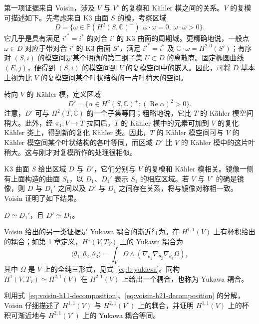 第一项证据来自 Voisin，涉及 $V$ 与 $V^\circ$ 的复模和 Kähler 模之间的关系。$V$ 的复模可描述如下。先考虑来自 K3 曲面 $S$ 的模，考察区域
\[
D=\{\omega\in\mathbb P(H^2(S,\mathbb C)^-):
\omega\cdot\omega=0,\ \omega\cdot\overline\omega>0\}.
\]
它几乎是具有满足 $i'^*=i^*$ 的对合 $i'$ 的 K3 曲面的周期域。更精确地说，一般点 $\omega\in D$ 对应于带对合 $i'$ 的 K3 曲面 $S'$，满足 $i'^*=i^*$ 及 $\mathbb C\cdot\omega=H^{2,0}(S')$；有序对 $(S,i)$ 的模空间是某个明确的第二纲子集 $U\subset D$ 的离散商。固定椭圆曲线 $(E,j)$，便得到 $(S,i)$ 的模空间到 $V$ 的复模空间中的嵌入。因此，可将 $D$ 基本上视为比 $V$ 的复模空间某个叶状结构的一片叶稍大的空间。

转向 $V$ 的 Kähler 模，定义区域
\[
D'=\{\alpha\in H^2(S,\mathbb C)^+:(\operatorname{Re}\alpha)^2>0\}.
\]
注意，$D'$ 可与 $H^2(T,\mathbb C)$ 的一个子集等同；粗略地说，它比 $T$ 的 Kähler 模空间稍大。此外，经 $\pi_1:V\to T$ 拉回后，$T$ 的 Kähler 模中的元素可加到 $V$ 的复化 Kähler 类上，得到新的复化 Kähler 类。因此，$T$ 的 Kähler 模空间可与 $V$ 的 Kähler 模空间某个叶状结构的各叶等同，而区域 $D'$ 比 $V$ 的 Kähler 模中的这片叶稍大。这与刚才对复模所作的处理很相似。

K3 曲面 $S$ 给出区域 $D$ 与 $D'$，它们分别与 $V$ 的复模和 Kähler 模相关。镜像一侧有上面构造的曲面 $S_1$，以 $D_1$、$D_1'$ 表示 $S_1$ 的相应区域。若 $V$ 与 $V^\circ$ 的确是镜像，则 $D$ 与 $D_1'$ 之间以及 $D'$ 与 $D_1$ 之间存在关系，将与镜像对称相一致。Voisin 证明了如下结果。
\begin{theorem}\label{thm:voisin-domains}
$D\simeq D_1'$，且 $D'\simeq D_1$。
\end{theorem}

Voisin 给出的另一类证据是 Yukawa 耦合的渐近行为。在 $H^{1,1}(V)$ 上有杯积给出的耦合；如\hyperref[chap:introduction]{第 1 章}定义，$H^1(V,T_V)$ 上的 Yukawa 耦合为
\begin{equation}\label{eq:voisin-yukawa}
\langle\theta_1,\theta_2,\theta_3\rangle
=\int_V\Omega\wedge
(\nabla_{\theta_1}\nabla_{\theta_2}\nabla_{\theta_3}\Omega),
\end{equation}
其中 $\Omega$ 是 $V$ 上的全纯三形式，见式~\eqref{eq:b-yukawa}。同构 $H^1(V,T_V)\simeq H^{2,1}(V)$ 在 $H^{2,1}(V)$ 上给出一个耦合，也称为 Yukawa 耦合。

利用式~\eqref{eq:voisin-h11-decomposition}、\eqref{eq:voisin-h21-decomposition} 的分解，Voisin 仔细描述了 $H^{1,1}(V)$ 与 $H^{2,1}(V^\circ)$ 上的耦合，并证明 $H^{1,1}(V)$ 上的杯积可渐近地与 $H^{2,1}(V^\circ)$ 上的 Yukawa 耦合等同。

